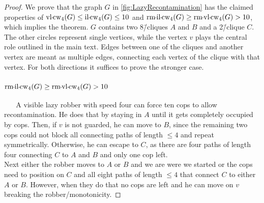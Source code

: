 \TheoremLazyRecontamination*
\begin{proof}
    We prove that the graph $G$ in \cref*{fig:LazyRecontamination} has the claimed properties of $\vlcopwidth{4}(G)\leq\ilcopwidth{4}(G)\leq10$ and $\rmilcopwidth{4}(G)\geq\rmvlcopwidth{4}(G)>10$, which implies the theorem. $G$ contains two 8\=/cliques $A$ and $B$ and a 2\=/clique $C$. The other circles represent single vertices, while the vertex $v$ plays the central role outlined in the main text.
    Edges between one of the cliques and another vertex are meant as multiple edges, connecting each vertex of the clique with that vertex. 
    For both directions it suffices to prove the stronger case.
    \subsubsection{$\rmilcopwidth{4}(G)\geq\rmvlcopwidth{4}(G)>10$}
    A visible lazy robber with speed four can force ten cops to allow recontamination. He does that by staying in $A$ until it gets completely occupied by cops. Then, if $v$ is not guarded, he can move to $B$, since the remaining two cops could not block all connecting paths of length $\leq 4$ and repeat symmetrically. Otherwise, he can escape to $C$, as there are four paths of length four connecting $C$ to $A$ and $B$ and only one cop left. \\
Next either the robber moves to $A$ or $B$ and we are were we started or the cops need to position on $C$ and all eight paths of length $\leq 4$ that connect $C$ to either $A$ or $B$. However, when they do that no cops are left and he can move on $v$ breaking the robber\-/monotonicity.


\end{proof}
